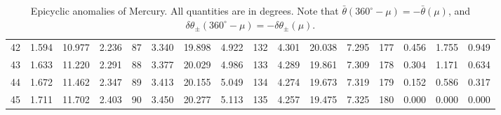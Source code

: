 \begin{table}[!h]
{\begin{tabular}{rrrr|rrrr|rrrr|rrrr}
 42 & \tiny{  1.594} &  10.977 & \tiny{  2.236} &  87 & \tiny{  3.340} &  19.898 & \tiny{  4.922} & 132 & \tiny{  4.301} &  20.038 & \tiny{  7.295} & 177 & \tiny{  0.456} &   1.755 & \tiny{  0.949}\\
 43 & \tiny{  1.633} &  11.220 & \tiny{  2.291} &  88 & \tiny{  3.377} &  20.029 & \tiny{  4.986} & 133 & \tiny{  4.289} &  19.861 & \tiny{  7.309} & 178 & \tiny{  0.304} &   1.171 & \tiny{  0.634}\\
 44 & \tiny{  1.672} &  11.462 & \tiny{  2.347} &  89 & \tiny{  3.413} &  20.155 & \tiny{  5.049} & 134 & \tiny{  4.274} &  19.673 & \tiny{  7.319} & 179 & \tiny{  0.152} &   0.586 & \tiny{  0.317}\\
 45 & \tiny{  1.711} &  11.702 & \tiny{  2.403} &  90 & \tiny{  3.450} &  20.277 & \tiny{  5.113} & 135 & \tiny{  4.257} &  19.475 & \tiny{  7.325} & 180 & \tiny{  0.000} &   0.000 & \tiny{  0.000}\\
\end{tabular}}
\caption{Epicyclic anomalies of Mercury. All quantities are in degrees. Note that $\bar{\theta}(360^\circ-\mu) = -\bar{\theta}(\mu)$, and $\delta\theta_{\pm}(360^\circ-\mu) = -\delta\theta_{\pm}(\mu)$. }\label{vt22}
\end{table}

